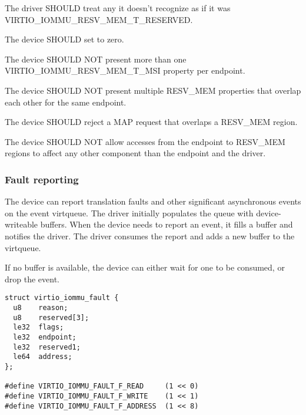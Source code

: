 The driver SHOULD treat any  it doesn't recognize as if it
was VIRTIO_IOMMU_RESV_MEM_T_RESERVED.


The device SHOULD set  to zero.

The device SHOULD NOT present more than one VIRTIO_IOMMU_RESV_MEM_T_MSI
property per endpoint.

The device SHOULD NOT present multiple RESV_MEM properties that overlap
each other for the same endpoint.

The device SHOULD reject a MAP request that overlaps a RESV_MEM region.

The device SHOULD NOT allow accesses from the endpoint to RESV_MEM regions
to affect any other component than the endpoint and the driver.

\subsubsection{Fault reporting}\label{sev:Device Types / IOMMU Device / Device operations / Fault reporting}

The device can report translation faults and other significant
asynchronous events on the event virtqueue. The driver initially populates
the queue with device-writeable buffers. When the device needs to report
an event, it fills a buffer and notifies the driver. The driver consumes
the report and adds a new buffer to the virtqueue.

If no buffer is available, the device can either wait for one to be
consumed, or drop the event.

\begin{lstlisting}
struct virtio_iommu_fault {
  u8    reason;
  u8    reserved[3];
  le32  flags;
  le32  endpoint;
  le32  reserved1;
  le64  address;
};

#define VIRTIO_IOMMU_FAULT_F_READ     (1 << 0)
#define VIRTIO_IOMMU_FAULT_F_WRITE    (1 << 1)
#define VIRTIO_IOMMU_FAULT_F_ADDRESS  (1 << 8)
\end{lstlisting}

